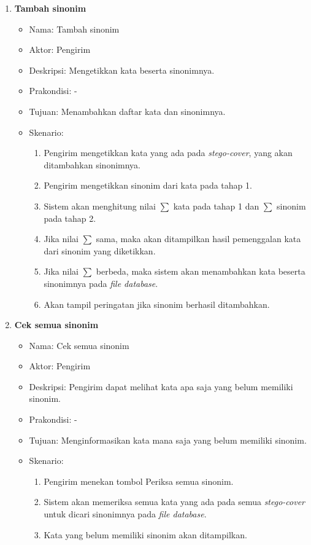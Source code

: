 \begin{enumerate}
	\item \textbf{Tambah sinonim}
	\begin{itemize}
		\item Nama: Tambah sinonim
		\item Aktor: Pengirim
		\item Deskripsi: Mengetikkan kata beserta sinonimnya.
		\item Prakondisi: -
		\item Tujuan: Menambahkan daftar kata dan sinonimnya.
		\item Skenario:
			\begin{enumerate}
				\item Pengirim mengetikkan kata yang ada pada \textit{stego-cover}, yang akan ditambahkan sinonimnya.
				\item Pengirim mengetikkan sinonim dari kata pada tahap 1.
				\item Sistem akan menghitung nilai $\sum$ kata pada tahap 1 dan $\sum$ sinonim pada tahap 2.
				\item Jika nilai $\sum$ sama, maka akan ditampilkan hasil pemenggalan kata dari sinonim yang diketikkan.
				\item Jika nilai $\sum$ berbeda, maka sistem akan menambahkan kata beserta sinonimnya pada \textit{file database}.
				\item Akan tampil peringatan jika sinonim berhasil ditambahkan.
			\end{enumerate}
	\end{itemize}
	
	\item \textbf{Cek semua sinonim}
	\begin{itemize}
		\item Nama: Cek semua sinonim
		\item Aktor: Pengirim
		\item Deskripsi: Pengirim dapat melihat kata apa saja yang belum memiliki sinonim.
		\item Prakondisi: -
		\item Tujuan: Menginformasikan kata mana saja yang belum memiliki sinonim.
		\item Skenario:
			\begin{enumerate}
				\item Pengirim menekan tombol Periksa semua sinonim.
				\item Sistem akan memeriksa semua kata yang ada pada semua \textit{stego-cover} untuk dicari sinonimnya pada \textit{file database}.
				\item Kata yang belum memiliki sinonim akan ditampilkan.
			\end{enumerate}
	\end{itemize}
	

\end{enumerate}
